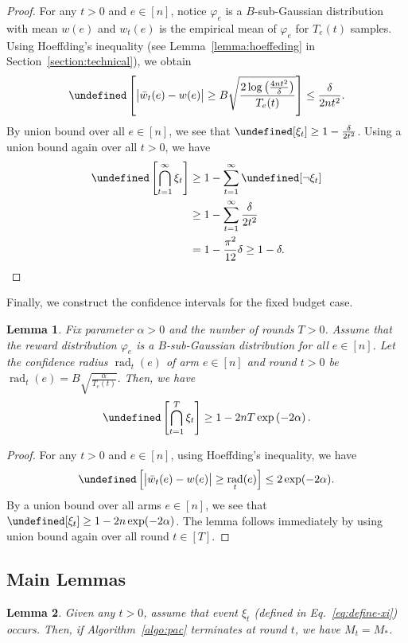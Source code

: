 \documentclass{article}
\newtheorem{lemma}{Lemma}
\newcommand{\Rew}{\varphi}
\DeclareMathOperator{\rad}{rad}
\let\Pr\undefined
\DeclareMathOperator{\Pr}{Pr}
\begin{document}
\begin{spacing}{1.1}
\begin{proof}
For any $t>0$ and $e\in [n]$, notice $\Rew_e$ is a $B$-sub-Gaussian distribution with mean $w(e)$ and $w_t(e)$ is the empirical mean of $\Rew_e$ for $T_e(t)$ samples. 
Using Hoeffding's inequality (see Lemma~\ref{lemma:hoeffeding} in Section~\ref{section:technical}), we obtain
$$
\Pr\left[ \big|\bar w_t(e)-w(e) \big| \ge B\sqrt{\frac{2\log\left(\frac{4n t^2}\delta\right)}{T_e(t)}} \right] \le \frac{\delta}{2nt^2}.
$$
By union bound over all $e\in [n]$, we see that $\Pr[\xi_t] \ge 1-\frac{\delta}{2t^2}$. 
Using a union bound again over all $t>0$, we have
\begin{align*}
\Pr\left[\bigcap_{t=1}^\infty \xi_t \right] &\ge 1-\sum_{t=1}^\infty \Pr[\neg \xi_t]\\
&\ge 1-\sum_{t=1}^\infty \frac{\delta}{2t^2}\\
&= 1-\frac{\pi^2}{12}\delta \ge 1-\delta.
\end{align*}
\end{proof}


Finally, we construct the confidence intervals for the fixed budget case.
\begin{lemma}
Fix parameter $\alpha > 0$ and the number of rounds $T > 0$.
Assume that the reward distribution $\Rew_e$ is a $B$-sub-Gaussian distribution for all $e\in [n]$.
Let the confidence radius $\rad_t(e)$ of arm $e\in[n]$ and round $t>0$ be 
$\rad_t(e)=B\sqrt{\frac{\alpha}{T_e(t)}}.$
Then, we have
$$
\Pr\left[\bigcap_{t=1}^T \xi_t \right] \ge 1-2nT\exp\left(-2\alpha\right).
$$
\label{lemma:ci-budget}
\end{lemma}

\begin{proof}
For any $t>0$ and $e\in[n]$, using Hoeffding's inequality, we have
$$
\Pr\left[ \big|\bar w_t(e)-w(e) \big| \ge \rad_t(e) \right] \le 2\exp(-2\alpha).
$$
By a union bound over all arms $e\in[n]$, we see that $\Pr[\xi_t] \ge 1-2n\exp(-2\alpha)$. 
The lemma follows immediately by using union bound again over all round $t\in [T]$.
\end{proof}

\subsection{Main Lemmas}

\begin{lemma}
\label{lemma:correct}
Given any $t > 0$, assume that event $\xi_t$ (defined in Eq.~\eqref{eq:define-xi}) occurs.
Then, if Algorithm~\ref{algo:pac} terminates at round $t$, we have $M_t=M_*$.
\end{lemma}


\end{spacing}
\end{document}
